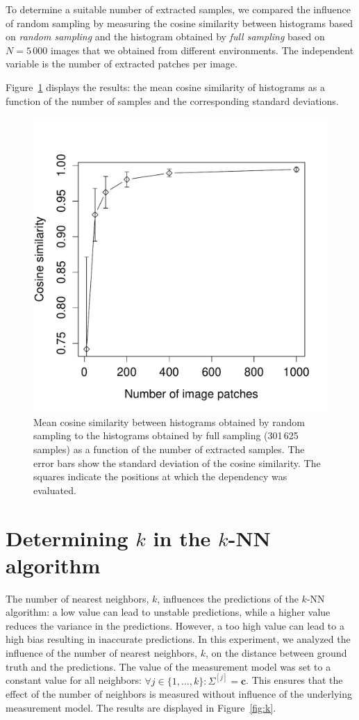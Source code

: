 \documentclass[11pt]{report}
\begin{document}
To determine a suitable number of extracted samples, we compared the
influence of random sampling by measuring the cosine similarity
between histograms based on \emph{random sampling} and the histogram
obtained by \emph{full sampling} based on $N = 5\,000$ images that we
obtained from different environments. The independent variable is the
number of extracted patches per image.

Figure~\ref{fig:cosine} displays the results: the mean cosine
similarity of histograms as a function of the number of samples and
the corresponding standard deviations.

\begin{figure}[H]
\begin{center}
\includegraphics[width=0.5\columnwidth]{samplescos}
\caption{{\label{fig:cosine} Mean cosine similarity between histograms
    obtained by random sampling to the histograms obtained by full
    sampling (301\,625 samples) as a function of the number of
    extracted samples. The error bars show the standard deviation of
    the cosine similarity. The squares indicate the positions at which
    the dependency was evaluated.%
  }}
\end{center}
\end{figure}


\section{Determining $k$ in the $k$-NN algorithm}
\label{sec:detk}

The number of nearest neighbors, $k$, influences the predictions of the
$k$-NN algorithm: a low value can lead to unstable predictions, while
a higher value reduces the variance in the predictions. However, a too
high value can lead to a high bias resulting in inaccurate
predictions. In this experiment, we analyzed the influence of the
number of nearest neighbors, $k$, on the distance between ground truth
and the predictions. The value of the measurement model was set to a
constant value for all neighbors: $\forall j \in \{1, \ldots, k\}:
\Sigma^{[j]} = \mathbf{c}$. This ensures that the effect of the number
of neighbors is measured without influence of the underlying
measurement model. The results are displayed in Figure~\ref{fig:k}.
\end{document}
